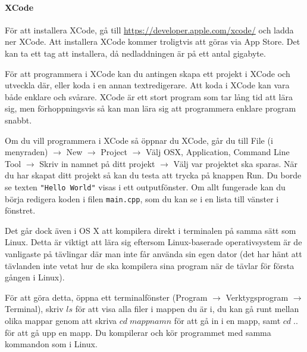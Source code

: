 \paragraph{XCode}
För att installera XCode, gå till \url{https://developer.apple.com/xcode/} och ladda ner XCode. Att installera XCode kommer troligtvis att göras via App Store. Det kan ta ett tag att installera, då nedladdningen är på ett antal gigabyte.

För att programmera i XCode kan du antingen skapa ett projekt i XCode och utveckla där, eller koda i en annan textredigerare.
Att koda i XCode kan vara både enklare och svårare. XCode är ett stort program som tar lång tid att lära sig, men förhoppningsvis så kan man lära sig att programmera enklare program snabbt.

Om du vill programmera i XCode så öppnar du XCode, går du till File (i menyraden) $\rightarrow$ New $\rightarrow$ Project $\rightarrow$ Välj OSX, Application, Command Line Tool $\rightarrow$ Skriv in namnet på ditt projekt $\rightarrow$ Välj var projektet ska sparas. När du har skapat ditt projekt så kan du testa att trycka på knappen Run. Du borde se texten \texttt{"Hello World"} visas i ett outputfönster. Om allt fungerade kan du börja redigera koden i filen \texttt{main.cpp}, som du kan se i en lista till vänster i fönstret.

Det går dock även i OS X att kompilera direkt i terminalen på samma sätt som Linux. Detta är viktigt att lära sig eftersom Linux-baserade operativsystem är de vanligaste på tävlingar där man inte får använda sin egen dator (det har hänt att tävlanden inte vetat hur de ska kompilera sina program när de tävlar för första gången i Linux).

För att göra detta, öppna ett terminalfönster (Program $\rightarrow$ Verktygsprogram $\rightarrow$ Terminal), skriv $ls$ för att visa alla filer i mappen du är i, du kan gå runt mellan olika mappar genom att skriva $cd \;mappnamn$ för att gå in i en mapp, samt $cd \;..$ för att gå upp en mapp. Du kompilerar och kör programmet med samma kommandon som i Linux.
